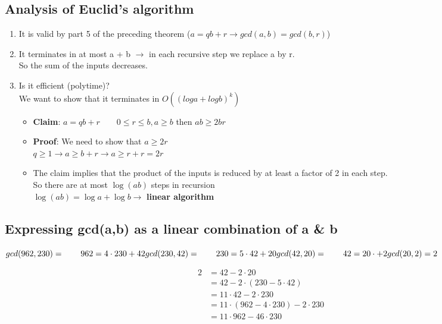 \documentclass[9pt, letterpaper, oneside]{article}
\begin{document}
\subsection{Analysis of Euclid's algorithm}
    \begin{enumerate}
        \item It is valid by part 5 of the preceding theorem ($a = qb + r \to gcd(a, b) = gcd(b, r)$)
        \item It terminates in at most a + b  $\to$ in each recursive step we replace a by r.\\
            So the sum of the inputs decreases.
        \item Is it efficient (polytime)?\\
            We want to show that it terminates in $O((log a + log b)^k)$
        \begin{itemize}
            \item \textbf{Claim}: $a = qb + r \qquad 0 \leq r \leq b, a \geq b$ then $ab \geq 2br$
            \item \textbf{Proof}: We need to show that $a\geq 2r$ \\
                $q \geq 1 \to a \geq b+r \to a \geq r+r = 2r$
            \item The claim implies that the product of the inputs is reduced by at least a factor of 2 in each step. \\
                So there are at most $\log(ab)$ steps in recursion \\
                $\log (ab) = \log a + \log b \to$ \textbf{linear algorithm}
        \end{itemize}
    \end{enumerate}

\subsection{Expressing gcd(a,b) as a linear combination of a \& b}
$gcd(962, 230) = \qquad 962 = 4 \cdot 230 + 42\\
gcd(230, 42) = \qquad 230 = 5 \cdot 42 + 20\\
gcd(42, 20) = \qquad 42 = 20 \cdot + 2\\
gcd(20, 2) =\\
2
$

\begin{align*}
2 &= 42 - 2 \cdot 20 \\
&= 42 - 2 \cdot (230 - 5 \cdot 42)\\
&= 11 \cdot 42 - 2 \cdot 230\\
&= 11 \cdot (962 - 4 \cdot 230) - 2 \cdot 230\\
&= 11 \cdot 962 - 46 \cdot 230
\end{align*}
\end{document}
